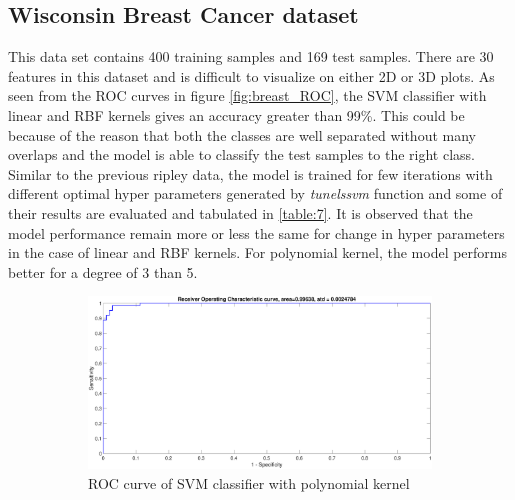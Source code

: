 \documentclass[12pt]{report}
\begin{document}
{\subsection{Wisconsin Breast Cancer dataset}
This data set contains   400 training samples and 169  test samples. There are 30 features in this dataset and is difficult to visualize on either 2D or 3D plots. As seen from the ROC curves in figure \ref{fig:breast_ROC}, the SVM classifier with linear and RBF kernels gives an accuracy greater than 99\%. This could be because of the reason that both the classes are well separated without many overlaps and the model is able to classify the test samples to the right class. Similar to the previous ripley data, the model is trained for few iterations with different optimal hyper parameters generated by \textit{tunelssvm} function and some of their results are evaluated and tabulated in \ref{table:7}. It is observed that the model performance remain more or less the same for change in hyper parameters in the case of linear and RBF kernels. For polynomial kernel, the model performs better for a degree of 3 than 5.
\begin{figure}[!ht] 
	\centering
	\begin{subfigure}{.35\textwidth}
		\centering
		\captionsetup{width=0.8\linewidth}
		\includegraphics[height=.65\linewidth, width=0.9\linewidth]{breast/breast_lin_ROC.eps}
		\caption{ROC curve of SVM classifier with polynomial kernel}
		\label{fig:breast_lin_ROC}
	\end{subfigure}%
	\begin{subfigure}{.35\textwidth}
		\centering
		\captionsetup{width=0.8\linewidth}

\end{subfigure}
\end{figure}}
\end{document}
